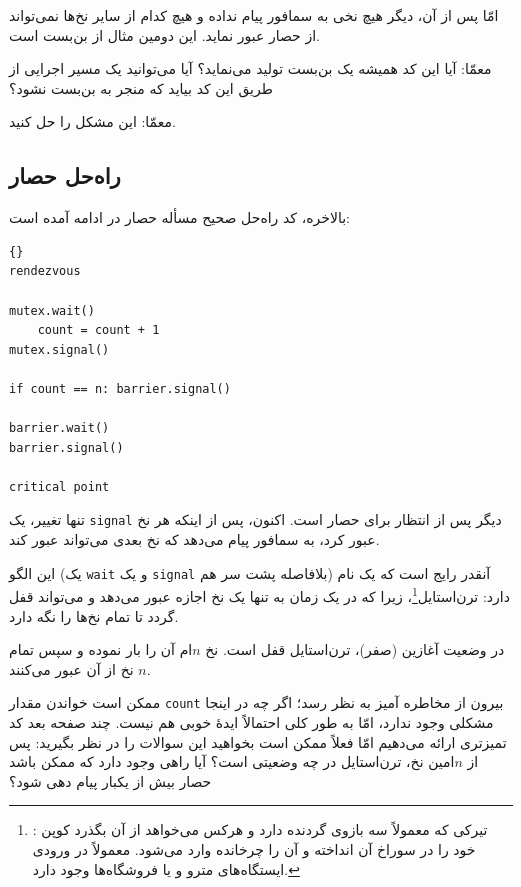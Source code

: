 \documentclass{book}
\newcommand{\clearemptydoublepage}{\newpage\cleardoublepage}
\begin{document}
    امّا پس از آن، دیگر هیچ نخی به سمافور پیام نداده و هیچ کدام از سایر نخ‌ها نمی‌تواند از حصار عبور نماید. این دومین مثال از بن‌بست است. 
    
    معمّا: آیا این کد همیشه یک بن‌بست تولید می‌نماید؟ آیا می‌توانید یک مسیر اجرایی از طریق این کد بیاید که منجر به بن‌بست نشود؟ 
    
    معمّا: این مشکل را حل کنید. 


\clearemptydoublepage
\subsection{راه‌حل حصار}
\label{barrier}

    بالاخره، کد راه‌حل صحیح مسأله حصار در ادامه آمده است:	

\begin{latin}
\begin{lstlisting}[title=\rl{راه‌حل حصار}]{}
rendezvous

mutex.wait()
    count = count + 1
mutex.signal()

if count == n: barrier.signal()

barrier.wait()
barrier.signal()

critical point
\end{lstlisting}
\end{latin}

    تنها تغییر، یک \texttt{signal} دیگر پس از انتظار برای حصار است. 
    اکنون، پس از اینکه هر نخ عبور کرد، به سمافور پیام می‌دهد که نخ بعدی می‌تواند عبور کند. 


    این الگو (یک \texttt{wait} و یک \texttt{signal} بلافاصله پشت سر هم) آنقدر رایج است که یک نام دارد: ترن‌استایل\footnote{%
    : 
    تیرکی که معمولاً سه بازوی گردنده دارد و هرکس می‌خواهد از آن بگذرد کوپن خود را در سوراخ آن انداخته و آن‌ را چرخانده وارد می‌شود. 
    معمولاً در ورودی ایستگاه‌های مترو و یا فروشگاه‌ها وجود دارد.}، 
    زیرا که در یک زمان به تنها یک نخ اجازه عبور می‌دهد و می‌تواند قفل گردد تا تمام نخ‌ها را نگه دارد. 
    
    در وضعیت آغازین (صفر)، ترن‌استایل قفل است. نخ  $n$ام آن را بار نموده و سپس تمام  $n$ نخ از آن عبور می‌کنند. 

    ممکن است خواندن مقدار \texttt{count} بیرون از  مخاطره‌ آمیز به نظر رسد؛ اگر چه در اینجا مشکلی وجود ندارد،
    امّا به طور کلی احتمالاً ایدهٔ خوبی هم نیست. چند صفحه بعد کد تمیزتری ارائه می‌دهیم امّا فعلاً ممکن است بخواهید این سوالات را در نظر بگیرید:
    پس از $n$امین نخ، ترن‌استایل در چه وضعیتی است؟ آیا راهی وجود دارد که ممکن باشد حصار بیش از یکبار پیام دهی شود؟
\end{document}
